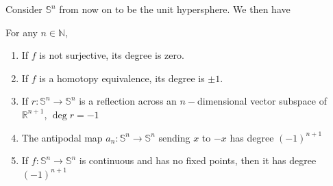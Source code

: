 \documentclass[12pt,reqno]{amsart}
\numberwithin{theorem}{section}
\theoremstyle{definition}
\theoremstyle{remark}
\numberwithin{equation}{section}
\newcommand{\N}{\mathbb N}
\renewcommand{\S}{\mathbb S}
\theoremstyle{definition}
\newcommand{\R}{\mathbb{R}}
\begin{document}
Consider $\S^n$ from now on to be the unit hypersphere. We then have 
\begin{corollary} For any $n \in \N$,
    \begin{enumerate}
        \item If $f$ is not surjective, its degree is zero.
        \item If $f$ is a homotopy equivalence, its degree is $\pm 1$. 
        \item If $r:\S^n \rightarrow \S^n$ is a reflection across an $n-$dimensional vector subspace of $\R^{n+1}$, $\deg r = -1$
        \item The antipodal map $a_n : \S^n \rightarrow \S^n$ sending $x$ to $-x$ has degree $(-1)^{n+1}$
        \item If $f:\S^n \rightarrow \S^n$ is continuous and has no fixed points, then it has degree $(-1)^{n+1}$
    \end{enumerate}
\end{corollary}
\end{document}
